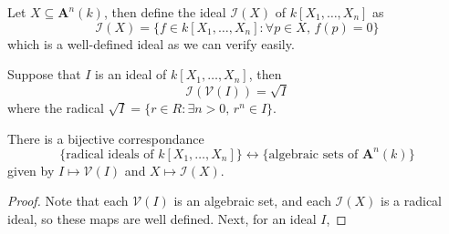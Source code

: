 \documentclass[11pt]{book}
\begin{document}
\begin{definition}Let $X\subseteq \mathbf A^n(k)$, then define the ideal $\mathcal{I}(X)$ of $k[X_1,\dots,X_n]$ as 
\[\mathcal{I}(X)=\{f\in k[X_1,\dots,X_n]:\forall p\in X,\,f(p)=0\}\]
which is a well-defined ideal as we can verify easily.
\end{definition}
\begin{lemma}Suppose that $I$ is an ideal of $k[X_1,\dots,X_n]$, then 
\[\mathcal{I}(\mathcal{V}(I))=\sqrt{I}\]
where the radical $\sqrt{I}=\{r\in R:\exists n>0,\, r^n\in I\}$.
\end{lemma}


\begin{theorembox}There is a bijective correspondance
\[\{\textrm{radical\ ideals\ of\ }k[X_1,\dots,X_n]\}\longleftrightarrow\{\textrm{algebraic\ sets\ of\ }\mathbf A^n(k)\}\]
given by $I\mapsto \mathcal{V}(I)$ and $X\mapsto \mathcal{I}(X)$.
\begin{proof}
Note that each $\mathcal{V}(I)$ is an algebraic set, and each $\mathcal{I}(X)$ is a radical ideal, so these maps are well defined. Next, for an ideal $I$, 
\end{proof}
\end{theorembox}
\end{document}
